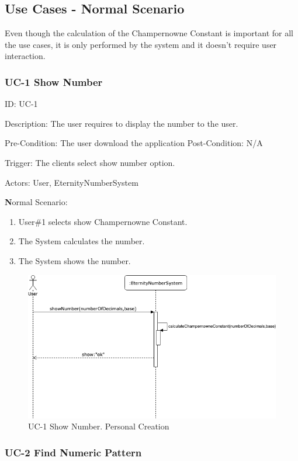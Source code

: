 \documentclass{report}
\begin{document}
\subsection{Use Cases - Normal Scenario}

Even though the calculation of the Champernowne Constant is important for all the use cases, it is only performed by the system and it doesn't require user interaction. 

\subsubsection{UC-1 Show Number}

ID: UC-1

Description: The user requires to display the number to the user.

Pre-Condition: The user download the application
Post-Condition: N/A

Trigger: The clients select show number option.

Actors: User, EternityNumberSystem

\textbf Normal Scenario:
\begin{enumerate}
\item User\#1 selects show Champernowne Constant.
\item The System calculates the number.
\item The System shows the number.
\newline
\end{enumerate}

\begin{figure}[H]
\includegraphics[scale=0.75]{images/showNumber.png}
\caption[UC-1 Show Number]{UC-1 Show Number. Personal Creation}
\end{figure}

\subsubsection{UC-2 Find Numeric Pattern}
\end{document}
